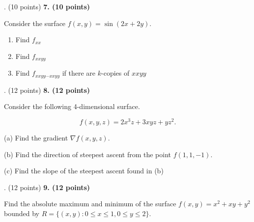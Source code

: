 \documentclass[12pt]{article}
\makeatletter
\newenvironment{problem}[1][]{%
  \bigskip%
  \noindent\begin{boxedminipage}{\columnwidth}%
  \def\@tempa{#1}%
  \ifx\@tempa\empty\else%
    \textbf{#1}\hspace{0.5em}%
  \fi%
}{%
  \end{boxedminipage}%
}
\makeatother
\begin{document}

\newpage
\begin{problem}[7. (10 points)]
Consider the surface $f(x,y) = \sin{(2x+2y)}$. 
\begin{enumerate}
    \item Find $f_{xx}$
    \item Find $f_{xxyy}$
    \item Find $f_{xxyy \cdots xxyy}$ if there are $k$-copies of $xxyy$
\end{enumerate}
\end{problem}


\newpage
\begin{problem}[8. (12 points)]
Consider the following 4-dimensional surface.

\begin{equation*}
    f(x,y,z) = 2x^3z+3xyz + yz^2.
\end{equation*}

(a) Find the gradient $\nabla f(x,y,z)$.

\vspace{.25cm}

(b) Find the direction of steepest ascent from the point $f(1,1,-1)$.

\vspace{.25cm}

(c) Find the slope of the steepest ascent found in (b)
\end{problem}

\newpage
\begin{problem}[9. (12 points)]
Find the absolute maximum and minimum of the surface $f(x,y) = x^2+xy+y^2$ bounded by $R = \{(x,y) : 0\leq x\leq 1, 0\leq y\leq 2\}$.
\end{problem}
\end{document}
